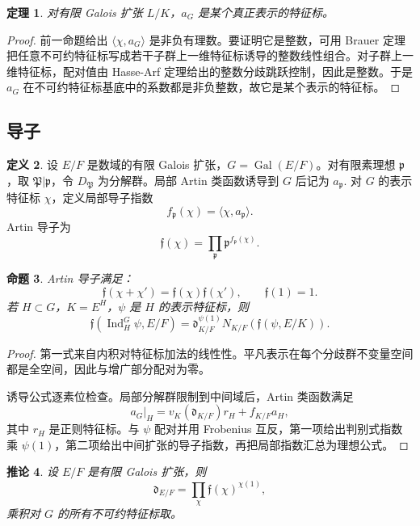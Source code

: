 \documentclass[11pt,a4paper,openany]{ctexbook}
\numberwithin{equation}{chapter}
\newcommand{\Gal}{\operatorname{Gal}}
\theoremstyle{plain}
\newtheorem{theorem}{定理}[chapter]
\newtheorem{proposition}[theorem]{命题}
\newtheorem{corollary}[theorem]{推论}
\theoremstyle{definition}
\newtheorem{definition}[theorem]{定义}
\theoremstyle{remark}
\begin{document}
\begin{theorem}
对有限 Galois 扩张 $L/K$，$a_G$ 是某个真正表示的特征标。
\end{theorem}

\begin{proof}
前一命题给出 $\langle\chi,a_G\rangle$ 是非负有理数。要证明它是整数，可用 Brauer 定理把任意不可约特征标写成若干子群上一维特征标诱导的整数线性组合。对子群上一维特征标，配对值由 Hasse-Arf 定理给出的整数分歧跳跃控制，因此是整数。于是 $a_G$ 在不可约特征标基底中的系数都是非负整数，故它是某个表示的特征标。
\end{proof}

\subsection{导子}

\begin{definition}
设 $E/F$ 是数域的有限 Galois 扩张，$G=\Gal(E/F)$。对有限素理想 $\mathfrak p$，取 $\mathfrak P|\mathfrak p$，令 $D_{\mathfrak P}$ 为分解群。局部 Artin 类函数诱导到 $G$ 后记为 $a_{\mathfrak p}$. 对 $G$ 的表示特征标 $\chi$，定义局部导子指数
\[
  f_{\mathfrak p}(\chi)=\langle\chi,a_{\mathfrak p}\rangle .
\]
Artin 导子为
\[
  \mathfrak f(\chi)=\prod_{\mathfrak p}\mathfrak p^{f_{\mathfrak p}(\chi)}.
\]
\end{definition}

\begin{proposition}
Artin 导子满足：
\[
  \mathfrak f(\chi+\chi')=\mathfrak f(\chi)\mathfrak f(\chi'),\qquad
  \mathfrak f(1)=1.
\]
若 $H\subset G$，$K=E^H$，$\psi$ 是 $H$ 的表示特征标，则
\[
  \mathfrak f(\operatorname{Ind}_{H}^{G}\psi,E/F)
  =
  \mathfrak d_{K/F}^{\psi(1)}
  N_{K/F}(\mathfrak f(\psi,E/K)).
\]
\end{proposition}

\begin{proof}
第一式来自内积对特征标加法的线性性。平凡表示在每个分歧群不变量空间都是全空间，因此与增广部分配对为零。

诱导公式逐素位检查。局部分解群限制到中间域后，Artin 类函数满足
\[
  a_G|_H=v_K(\mathfrak d_{K/F})r_H+f_{K/F}a_H,
\]
其中 $r_H$ 是正则特征标。与 $\psi$ 配对并用 Frobenius 互反，第一项给出判别式指数乘 $\psi(1)$，第二项给出中间扩张的导子指数，再把局部指数汇总为理想公式。
\end{proof}

\begin{corollary}
设 $E/F$ 是有限 Galois 扩张，则
\[
  \mathfrak d_{E/F}=\prod_{\chi}\mathfrak f(\chi)^{\chi(1)},
\]
乘积对 $G$ 的所有不可约特征标取。
\end{corollary}
\end{document}
